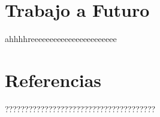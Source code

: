 \documentclass[11pt]{article}
\begin{document}
\section{Trabajo a Futuro}

ahhhhreeeeeeeeeeeeeeeeeeeeeee

\section{Referencias}

??????????????????????????????????????
\end{document}
